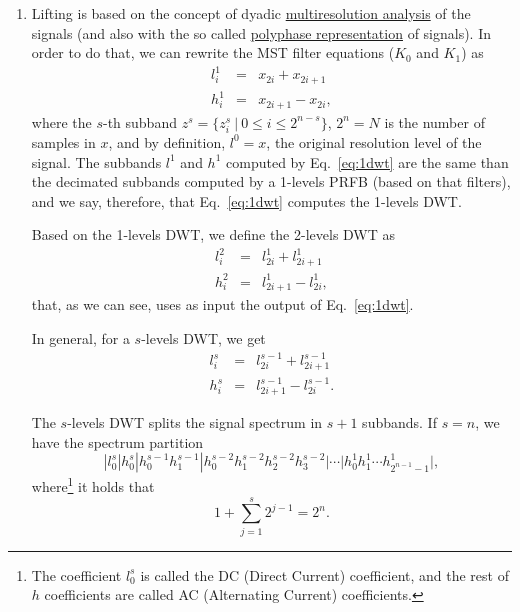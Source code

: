 \begin{enumerate}
\item Lifting is based on the concept of dyadic
  \href{https://en.wikipedia.org/wiki/Multiresolution_analysis}{multiresolution
    analysis} of the signals (and also with the so called
  \href{https://en.wikipedia.org/wiki/Polyphase_matrix}{polyphase
    representation} of signals). In order to do that, we can rewrite
  the MST filter equations ($K_0$ and $K_1$) as
  \begin{equation}
    \begin{array}{rcl}
      l^1_i & = & x_{2i} + x_{2i+1} \\
      h^1_i & = & x_{2i+1} - x_{2i},
    \end{array}
    \label{eq:1dwt}
  \end{equation}
  where the $s$-th subband $z^s=\{z_i^s~|~0\le i\le 2^{n-s}\}$, $2^n=N$ is the
  number of samples in $x$, and by definition, $l^0=x$, the original
  resolution level of the signal. The subbands $l^1$ and $h^1$
  computed by Eq.~\ref{eq:1dwt} are the same than the decimated
  subbands computed by a 1-levels PRFB (based on that filters), and we
  say, therefore, that Eq.~\ref{eq:1dwt} computes the 1-levels DWT.

  Based on the 1-levels DWT, we define the 2-levels DWT as
  \begin{equation}
    \begin{array}{rcl}
      l^2_i & = & l^1_{2i} + l^1_{2i+1} \\
      h^2_i & = & l^1_{2i+1} - l^1_{2i},
    \end{array}
    \label{eq:2dwt}
  \end{equation}
  that, as we can see, uses as input the output of Eq.~\ref{eq:1dwt}.

  In general, for a $s$-levels DWT, we get
    \begin{equation}
    \begin{array}{rcl}
      l^s_i & = & l^{s-1}_{2i} + l^{s-1}_{2i+1} \\
      h^s_i & = & l^{s-1}_{2i+1} - l^{s-1}_{2i}.
    \end{array}
    \label{eq:2dwt}
  \end{equation}

  The $s$-levels DWT splits the signal spectrum in $s+1$ subbands. If
  $s=n$, we have the spectrum partition
  \begin{equation*}
    | l^s_0 | h^s_0 | h^{s-1}_0 h^{s-1}_1 | h^{s-2}_0 h^{s-2}_1 h^{s-2}_2 h^{s-2}_3 | \cdots | h^1_0 h^1_1 \cdots h^1_{2^{n-1}-1} |,
  \end{equation*}
  where\footnote{The coefficient $l^s_0$ is called the DC (Direct
    Current) coefficient, and the rest of $h$ coefficients are called
    AC (Alternating Current) coefficients.} it holds that
  \begin{equation}
    1+\sum_{j=1}^s 2^{j-1}=2^n.
  \end{equation}


\end{enumerate}
